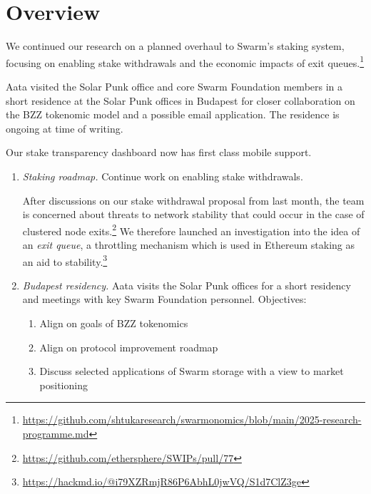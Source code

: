 \maketitle
\section*{Overview}

We continued our research on a planned overhaul to Swarm's staking system, focusing on enabling stake withdrawals and the economic impacts of exit queues.\footnote{\url{https://github.com/shtukaresearch/swarmonomics/blob/main/2025-research-programme.md}}

Aata visited the Solar Punk office and core Swarm Foundation members in a short residence at the Solar Punk offices in Budapest for closer collaboration on the BZZ tokenomic model and a possible email application.
%
The residence is ongoing at time of writing.

Our stake transparency dashboard now has first class mobile support.

\begin{enumerate}
  \item \emph{Staking roadmap.} Continue work on enabling stake withdrawals.

  After discussions on our stake withdrawal proposal from last month, the team is concerned about threats to network stability that could occur in the case of clustered node exits.\footnote{\url{https://github.com/ethersphere/SWIPs/pull/77}}
  We therefore launched an investigation into the idea of an \emph{exit queue}, a throttling mechanism which is used in Ethereum staking as an aid to stability.\footnote{\url{https://hackmd.io/@i79XZRmjR86P6AbhL0jwVQ/S1d7ClZ3ge}}


  \item \emph{Budapest residency.} Aata visits the Solar Punk offices for a short residency and meetings with key Swarm Foundation personnel.
  Objectives:
  \begin{enumerate}
    \item Align on goals of BZZ tokenomics
    \item Align on protocol improvement roadmap
    \item Discuss selected applications of Swarm storage with a view to market positioning
  \end{enumerate}
  
\end{enumerate}

